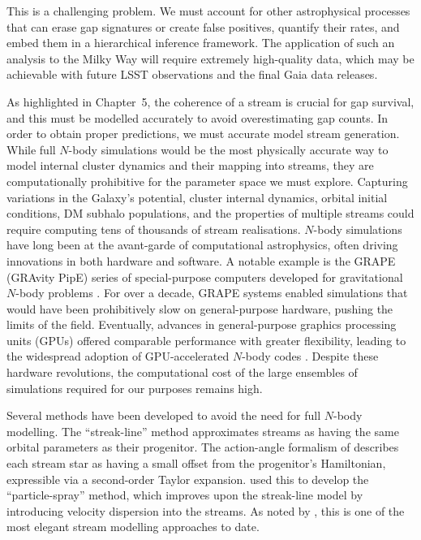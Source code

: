         This is a challenging problem. We must account for other astrophysical processes that can erase gap signatures or create false positives, quantify their rates, and embed them in a hierarchical inference framework. The application of such an analysis to the Milky Way will require extremely high-quality data, which may be achievable with future LSST observations and the final Gaia data releases.

        As highlighted in Chapter~5, the coherence of a stream is crucial for gap survival, and this must be modelled accurately to avoid overestimating gap counts. In order to obtain proper predictions, we must accurate model stream generation. While full $N$-body simulations would be the most physically accurate way to model internal cluster dynamics and their mapping into streams, they are computationally prohibitive for the parameter space we must explore. Capturing variations in the Galaxy's potential, cluster internal dynamics, orbital initial conditions, DM subhalo populations, and the properties of multiple streams could require computing tens of thousands of stream realisations. $N$-body simulations have long been at the avant-garde of computational astrophysics, often driving innovations in both hardware and software. A notable example is the GRAPE (GRAvity PipE) series of special-purpose computers developed for gravitational $N$-body problems \citep{1991PASJ...43..841F,1997ApJ...480..432M}. For over a decade, GRAPE systems enabled simulations that would have been prohibitively slow on general-purpose hardware, pushing the limits of the field. Eventually, advances in general-purpose graphics processing units (GPUs) offered comparable performance with greater flexibility, leading to the widespread adoption of GPU-accelerated $N$-body codes \citep{2012MNRAS.424..545N,2015MNRAS.450.4070W}. Despite these hardware revolutions, the computational cost of the large ensembles of simulations required for our purposes remains high.

        Several methods have been developed to avoid the need for full $N$-body modelling. The ``streak-line'' method \citep{2012MNRAS.420.2700K} approximates streams as having the same orbital parameters as their progenitor. The action-angle formalism of \citet{2011MNRAS.413.1852E} describes each stream star as having a small offset from the progenitor's Hamiltonian, expressible via a second-order Taylor expansion. \citet{2014ApJ...795...95B} used this to develop the ``particle-spray'' method, which improves upon the streak-line model by introducing velocity dispersion into the streams. As noted by \citet{2015MNRAS.452..301F}, this is one of the most elegant stream modelling approaches to date.

